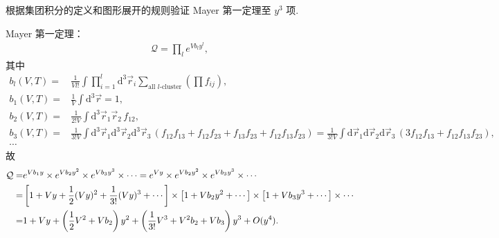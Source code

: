 \documentclass{assignment}
\begin{document}
\begin{prob}
    根据集团积分的定义和图形展开的规则验证 Mayer 第一定理至 $y^3$ 项.
\end{prob}
\begin{pf}
    Mayer 第一定理：
    \begin{align}
        \mathcal{Q}=\prod_le^{Vb_ly^l},
    \end{align}
    其中
    \begin{align}
        b_l(V,T)=&\frac{1}{Vl!}\int\prod_{i=1}^l\mathrm{d}^3\vec{r}_i\sum_{\text{all $l$-cluster}}\left(\prod f_{ij}\right),\\
        b_1(V,T)=&\frac{1}{V}\int\mathrm{d}^3\vec{r}=1,\\
        b_2(V,T)=&\frac{1}{2!V}\int\mathrm{d}^3\vec{r}_1\vec{r}_2\,f_{12},\\
        b_3(V,T)=&\frac{1}{3!V}\int\mathrm{d}^3\vec{r}_1\mathrm{d}^3\vec{r}_2\mathrm{d}^3\vec{r}_3\,(f_{12}f_{13}+f_{12}f_{23}+f_{13}f_{23}+f_{12}f_{13}f_{23})=\frac{1}{3!V}\int\mathrm{d}\vec{r}_1\mathrm{d}\vec{r}_2\mathrm{d}\vec{r}_3\,(3f_{12}f_{13}+f_{12}f_{13}f_{23}),\\
        \cdots&
    \end{align}
    故
    \begin{align}
        \notag\mathcal{Q}=&e^{Vb_1y}\times e^{Vb_2y^2}\times e^{Vb_3y^3}\times\cdots=e^{Vy}\times e^{Vb_2y^2}\times e^{Vb_3y^3}\times\cdots\\
        \notag=&\left[1+Vy+\frac{1}{2}(Vy)^2+\frac{1}{3!}(Vy)^3+\cdots\right]\times\left[1+Vb_2y^2+\cdots\right]\times\left[1+Vb_3y^3+\cdots\right]\times\cdots\\
        =&1+Vy+\left(\frac{1}{2}V^2+Vb_2\right)y^2+\left(\frac{1}{3!}V^3+V^2b_2+Vb_3\right)y^3+O(y^4).
    \end{align}
\end{pf}
\end{document}
